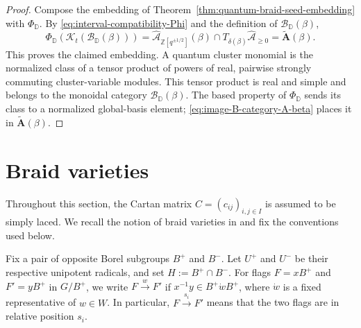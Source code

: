\documentclass[12pt, reqno]{amsart}
\theoremstyle{plain}
\theoremstyle{definition}
\numberwithin{equation}{section}
\newcommand{\ZZ}{\mathbb{Z}}
\newcommand{\DD}{\mathbb{D}}
\newcommand{\cA}{\mathcal{A}}
\begin{document}
\begin{proof}
Compose the embedding of
Theorem~\ref{thm:quantum-braid-seed-embedding} with \(\Phi_{\DD}\).
By \eqref{eq:interval-compatibility-Phi} and the definition of
\(\mathscr B_{\DD}(\beta)\),
\begin{equation}\label{eq:image-B-category-A-beta}
 \Phi_{\DD}\!\left(
   \mathcal K_t(\mathscr B_{\DD}(\beta))\right)
 =\widehat{\cA}_{\ZZ[q^{\pm1/2}]}(\beta)
      \cap T_{\delta(\beta)}\widehat{\cA}_{\geq0}
 =\widetilde{\mathbf A}(\beta).
\end{equation}
This proves the claimed embedding. A quantum cluster monomial is
the normalized class of a tensor product of powers of real,
pairwise strongly commuting cluster-variable modules. This tensor
product is real and simple and belongs to the monoidal category
\(\mathscr B_{\DD}(\beta)\). The based property of
\(\Phi_{\DD}\) sends its class to a normalized global-basis
element; \eqref{eq:image-B-category-A-beta} places it in
\(\widetilde{\mathbf A}(\beta)\).
\end{proof}



\section{Braid varieties}\label{sec:braid-variety}

Throughout this section, the Cartan matrix
\(C=(c_{ij})_{i,j\in I}\) is assumed to be simply laced. We recall the
notion of braid varieties in \cite{casals2025cluster} and fix
the conventions used below.

Fix a pair of opposite Borel subgroups \(B^+\) and \(B^-\). Let \(U^+\)
and \(U^-\) be their respective unipotent radicals, and set
\(H:=B^+\cap B^-\). For flags \(F=xB^+\) and \(F'=yB^+\) in \(G/B^+\),
we write \(F\xrightarrow{w}F'\) if
\(x^{-1}y\in B^+\dot wB^+\), where \(\dot w\) is a fixed representative
of \(w\in W\). In particular, \(F\xrightarrow{s_i}F'\) means that the
two flags are in relative position \(s_i\).
\end{document}
